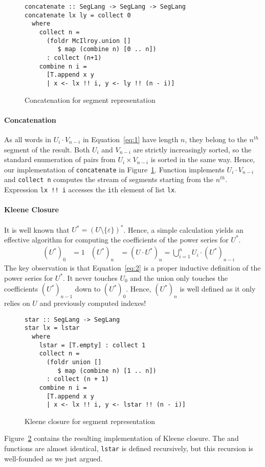 \begin{figure}[tp]
\begin{lstlisting}
concatenate :: SegLang -> SegLang -> SegLang
concatenate lx ly = collect 0
  where
    collect n =
      (foldr McIlroy.union []
         $ map (combine n) [0 .. n])
      : collect (n+1)
    combine n i =
      [T.append x y 
      | x <- lx !! i, y <- ly !! (n - i)]
\end{lstlisting}
  \caption{Concatenation for segment representation}
  \label{fig:concatenate-with-segments}
\end{figure}

\paragraph{Concatenation}
As all
words in $U_i \cdot V_{n-i}$ in Equation~\eqref{eq:1} have length $n$, they belong to the
$n^{th}$ segment of the result. Both $U_i$ and
$V_{n-i}$ are strictly increasingly sorted, so the standard enumeration of pairs from
$U_i \times
V_{n-i}$ is sorted in the same way. Hence, our implementation of
\lstinline{concatenate} in Figure~\ref{fig:concatenate-with-segments}.  Function  implements $U_i
\cdot V_{n-i}$ and  \lstinline{collect n} computes the stream of segments starting from
the $n^{th}$. Expression \lstinline{lx !! i} accesses the \lstinline{i}th element of
list \lstinline{lx}.  


\paragraph{Kleene Closure}
It is well known that $U^* = (U\setminus\{\varepsilon\})^*$. 
Hence, a simple calculation yields an
effective algorithm for computing the coefficients of the power series for $U^*$. 
\begin{align}
  \label{eq:2}
  &%
  & (U^*)_0 &= 1
  & (U^*)_n &= (U \cdot U^*)_n = \bigcup_{i=1}^n U_i\cdot (U^*)_{n-i}
\end{align}
The key observation is that Equation~\eqref{eq:2} is a proper
inductive definition of the power series for $U^*$. It never touches $U_0$ and the union
only touches the coefficients $(U^*)_{n-1}$ down to $(U^*)_0$. Hence, $(U^*)_n$ is well
defined as it only relies on $U$ and previously computed indexes!

\begin{figure}[tp]
\begin{lstlisting}
star :: SegLang -> SegLang
star lx = lstar
  where
    lstar = [T.empty] : collect 1
    collect n =
      (foldr union [] 
         $ map (combine n) [1 .. n])
      : collect (n + 1)
    combine n i =
      [T.append x y 
      | x <- lx !! i, y <- lstar !! (n - i)]
\end{lstlisting}
  \caption{Kleene closure for segment representation}
  \label{fig:star-with-segments}
\end{figure}
Figure~\ref{fig:star-with-segments} contains the resulting implementation of Kleene closure.
The  and  functions are almost
identical, \lstinline{lstar} is defined recursively, but this recursion is well-founded as
we just argued. 

